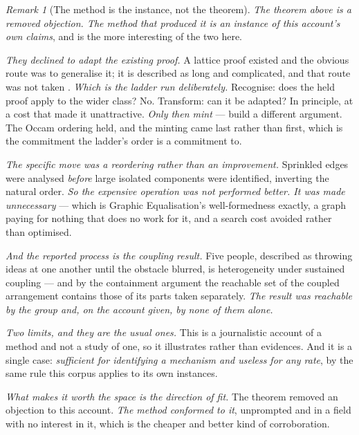 \documentclass[11pt,a4paper]{article}
\theoremstyle{remark}
\newtheorem{remark}[definition]{Remark}
\begin{document}
\begin{remark}[The method is the instance, not the theorem]\label{rem:method}
\emph{The theorem above is a removed objection. The method that produced it is an instance of this
account's own claims}, and is the more interesting of the two here.

\emph{They declined to adapt the existing proof.} A lattice proof existed and the obvious route was to
generalise it; it is described as long and complicated, and that route was not taken
\citep{percolation2026}. \emph{Which is the ladder run deliberately.} Recognise: does the held proof
apply to the wider class? No. Transform: can it be adapted? In principle, at a cost that made it
unattractive. \emph{Only then mint} --- build a different argument. The Occam ordering held, and the
minting came last rather than first, which is the commitment the ladder's order is a commitment to.

\emph{The specific move was a reordering rather than an improvement.} Sprinkled edges were analysed
\emph{before} large isolated components were identified, inverting the natural order. \emph{So the
expensive operation was not performed better. It was made unnecessary} --- which is Graphic
Equalisation's well-formedness exactly, a graph paying for nothing that does no work for it, and a search
cost avoided rather than optimised.

\emph{And the reported process is the coupling result.} Five people, described as throwing ideas at one
another until the obstacle blurred, is heterogeneity under sustained coupling --- and by the
containment argument the reachable set of the coupled arrangement contains those of its parts taken
separately. \emph{The result was reachable by the group and, on the account given, by none of them
alone.}

\emph{Two limits, and they are the usual ones.} This is a journalistic account of a method and not a
study of one, so it illustrates rather than evidences. And it is a single case: \emph{sufficient for
identifying a mechanism and useless for any rate}, by the same rule this corpus applies to its own
instances.

\emph{What makes it worth the space is the direction of fit.} The theorem removed an objection to this
account. \emph{The method conformed to it}, unprompted and in a field with no interest in it, which is
the cheaper and better kind of corroboration.
\end{remark}
\end{document}
